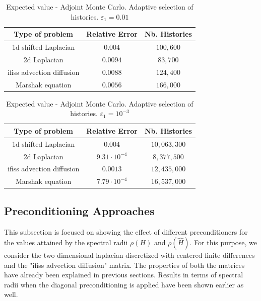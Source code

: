 \begin{table}[!h]
\centering
\begin{tabular}{|c|c|c|}
\hline
\textbf{Type of problem} & \textbf{Relative Error} &\textbf{Nb. Histories}\\
\hline
1d shifted Laplacian & $0.004$ & $100,600$\\
\hline
2d Laplacian & $0.0094$ & $83,700$\\
\hline
ifiss advection diffusion & $0.0088$  & $124,400$\\
\hline
Marshak equation & $0.0056$ & $166,000$\\
\hline
\end{tabular}
\caption{Expected value - Adjoint Monte Carlo. Adaptive selection of histories.
$\varepsilon_1=0.01$}
\label{tab:Adj_adapt5}
\end{table}



\begin{table}[!h]
\centering
\begin{tabular}{|c|c|c|}
\hline
\textbf{Type of problem} & \textbf{Relative Error} &\textbf{Nb. Histories}\\
\hline
1d shifted Laplacian & $0.004$ & $10,063,300$\\
\hline
2d Laplacian & $ 9.31 \cdot 10^{-4} $ & $ 8,377,500 $\\
\hline
ifiss advection diffusion & $ 0.0013 $  & $ 12,435,000 $\\
\hline
Marshak equation & $7.79 \cdot 10^{-4}$ & $16,537,000$\\
\hline
\end{tabular}
\caption{Expected value - Adjoint Monte Carlo. Adaptive selection of histories.
$\varepsilon_1=10^{-3}$}
\label{tab:Adj_adapt6}
\end{table}

\subsection{Preconditioning Approaches}

This subsection is focused on showing the effect of different preconditioners
for the values attained by the spectral radii $\rho(H)$ and $\rho(\hat{H})$.
For this purpose, we consider the two dimensional laplacian
discretized with centered finite differences and the "ifiss advection
diffusion" matrix. The properties of both the matrices have already been
explained in previous sections.
Results in terms of spectral radii when the diagonal preconditioning is applied
have been shown earlier as well.

